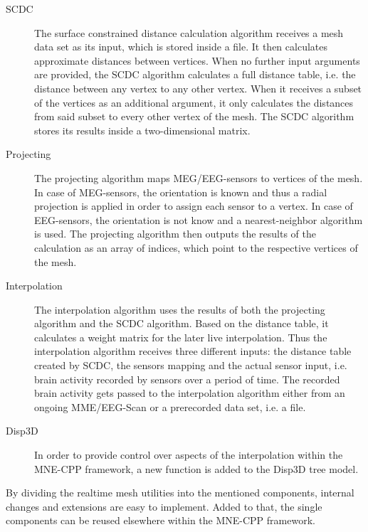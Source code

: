 \documentclass[a4paper, 11pt, english, fleqn]{article}
\begin{document}
\begin{description}
	
	\item[SCDC] 
	The surface constrained distance calculation algorithm receives a mesh data set as its input, which is stored inside a file. It then calculates approximate distances between vertices. When no further input arguments are provided, the SCDC algorithm calculates a full distance table, i.e. the distance between any vertex to any other vertex.
	When it receives a subset of the vertices as an additional argument, it only calculates the distances from said subset to every other vertex of the mesh. The SCDC algorithm stores its results inside a two-dimensional matrix.
	
	\item[Projecting]
	The projecting algorithm maps MEG/EEG-sensors to vertices of the mesh. In case of MEG-sensors, the orientation is known and thus a radial projection is applied in order to assign each sensor to a vertex. In case of EEG-sensors, the orientation is not know and a nearest-neighbor algorithm is used.
	The projecting algorithm then outputs the results of the calculation as an array of indices, which point to the respective vertices of the mesh.
	
	\item[Interpolation]
	The interpolation algorithm uses the results of both the projecting algorithm and the SCDC algorithm.
	Based on the distance table, it calculates a weight matrix for the later live interpolation. 
	Thus the interpolation algorithm receives three different inputs: the distance table created by SCDC, the sensors mapping and the actual sensor input, i.e. brain activity recorded by sensors over a period of time.
	The recorded brain activity gets passed to the interpolation algorithm either from an ongoing MME/EEG-Scan or a prerecorded data set, i.e. a file. 
	
	\item[Disp3D]
	In order to provide control over aspects of the interpolation within the MNE-CPP framework, a new function is added to the Disp3D tree model.
		
\end{description}

By dividing the realtime mesh utilities into the mentioned components, internal changes and extensions are easy to implement. Added to that, the single components can be reused elsewhere within the MNE-CPP framework.

\clearpage
\end{document}
